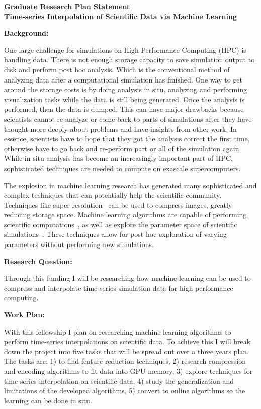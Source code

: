 \documentclass[12pt]{article}
\begin{document}
\begin{center}
\underline{\bf Graduate Research Plan Statement}\\
{\bf Time-series Interpolation of Scientific Data via Machine Learning} \\
\end{center}


\textbf{Background:}
%

 One large challenge for simulations on High Performance Computing
(HPC) is handling data. There is not enough storage capacity to save simulation
output to disk and perform post hoc analysis. Which is the conventional method
of analyzing data after a computational simulation has finished. One way to get
around the storage costs is by doing analysis in situ, analyzing and performing
visualization tasks while the data is still being generated. Once the analysis
is performed, then the data is dumped. This can have major drawbacks because
scientists cannot re-analyze or come back to parts of simulations after they
have thought more deeply about problems and have insights from other work. In
essence, scientists have to hope that they got the analysis correct the first
time, otherwise have to go back and re-perform part or all of the simulation
again. While in situ analysis has become an increasingly important part of HPC,
sophisticated techniques are needed to compute on exascale supercomputers.

 The explosion in machine learning research has generated many
sophisticated and complex techniques that can potentially help the scientific
community. Techniques like super resolution~\cite{super} can be used to
compress images, greatly reducing storage space. Machine learning algorithms are
capable of performing scientific computations~\cite{Berg}, as well as explore
the parameter space of scientific simulations~\cite{He}. These techniques 
allow for post hoc exploration of varying parameters without performing new
simulations.


\textbf{Research Question:}

 Through this funding I will be researching how machine learning can be
used to compress and interpolate time series simulation data for high
performance computing.


\textbf{Work Plan:}

 With this fellowship I plan on researching machine learning algorithms
to perform time-series interpolations on scientific data. To achieve this I will
break down the project into five tasks that will be spread out over a three
years plan. The tasks are: 1) to find feature reduction techniques, 2) research
compression and encoding algorithms to fit data into GPU memory, 3) explore
techniques for time-series interpolation on scientific data, 4) study the
generalization and limitations of the developed algorithms, 5) convert to online
algorithms so the learning can be done in situ.
\end{document}
